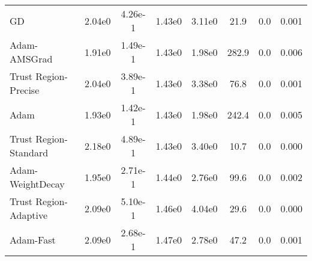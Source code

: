 \documentclass{article}
\begin{document}
\begin{table}[htbp]
{\begin{tabular}{p{2.5cm}*{7}{c}}
GD & 2.04e0 & 4.26e-1 & 1.43e0 & 3.11e0 & 21.9 & 0.0 & 0.001 \\
Adam-AMSGrad & 1.91e0 & 1.49e-1 & 1.43e0 & 1.98e0 & 282.9 & 0.0 & 0.006 \\
Trust Region-Precise & 2.04e0 & 3.89e-1 & 1.43e0 & 3.38e0 & 76.8 & 0.0 & 0.001 \\
Adam & 1.93e0 & 1.42e-1 & 1.43e0 & 1.98e0 & 242.4 & 0.0 & 0.005 \\
Trust Region-Standard & 2.18e0 & 4.89e-1 & 1.43e0 & 3.40e0 & 10.7 & 0.0 & 0.000 \\
Adam-WeightDecay & 1.95e0 & 2.71e-1 & 1.44e0 & 2.76e0 & 99.6 & 0.0 & 0.002 \\
Trust Region-Adaptive & 2.09e0 & 5.10e-1 & 1.46e0 & 4.04e0 & 29.6 & 0.0 & 0.000 \\
Adam-Fast & 2.09e0 & 2.68e-1 & 1.47e0 & 2.78e0 & 47.2 & 0.0 & 0.001 \\
\bottomrule
\end{tabular}
}
\end{table}
\end{document}
